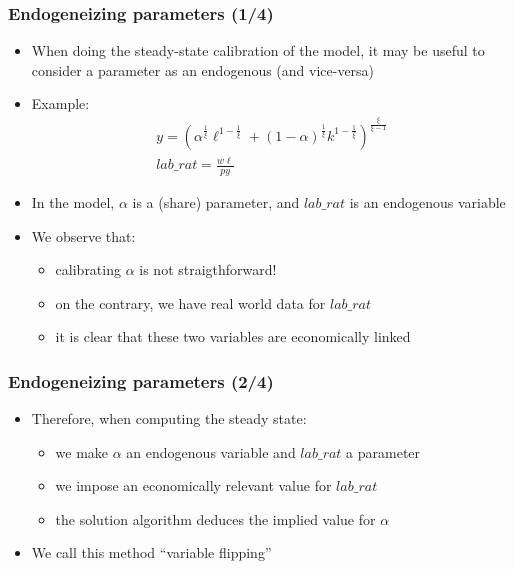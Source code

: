 \documentclass{beamer}
\begin{document}
\begin{frame}
  \frametitle{Endogeneizing parameters (1/4)}
  \begin{itemize}
  \item When doing the steady-state calibration of the model, it may be useful to consider a parameter as an endogenous (and vice-versa)
  \item Example:
    \begin{gather*}
      y = \left(\alpha^{\frac{1}{\xi}} \ell^{1-\frac{1}{\xi}} + (1-\alpha)^{\frac{1}{\xi}}k^{1-\frac{1}{\xi}}\right)^{\frac{\xi}{\xi - 1}} \\
      lab\_rat = \frac{w \ell}{p y}
    \end{gather*}
  \item In the model, $\alpha$ is a (share) parameter, and $lab\_rat$ is an endogenous variable
  \item We observe that:
    \begin{itemize}
    \item calibrating $\alpha$ is not straigthforward!
    \item on the contrary, we have real world data for $lab\_rat$
    \item it is clear that these two variables are economically linked
    \end{itemize}
  \end{itemize}
\end{frame}

\begin{frame}[fragile=singleslide]
  \frametitle{Endogeneizing parameters (2/4)}
  \begin{itemize}
  \item Therefore, when computing the steady state:
    \begin{itemize}
    \item we make $\alpha$ an endogenous variable and $lab\_rat$ a parameter
    \item we impose an economically relevant value for $lab\_rat$
    \item the solution algorithm deduces the implied value for $\alpha$
    \end{itemize}
  \item We call this method ``variable flipping''
  \end{itemize}
\end{frame}
\end{document}
